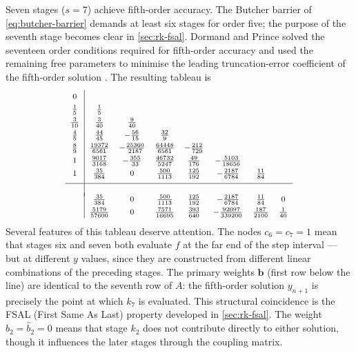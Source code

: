 Seven stages ($s = 7$) achieve fifth-order accuracy.  The Butcher barrier of \cref{eq:butcher-barrier}
demands at least six stages for order five; the purpose of the seventh
stage becomes clear in \cref{sec:rk-fsal}.  Dormand and Prince solved
the seventeen order conditions required for fifth-order accuracy and
used the remaining free parameters to minimise the leading
truncation-error coefficient of the fifth-order solution
\cite{DormandPrince1980}.  The resulting tableau is
%
\begin{equation}
  \renewcommand{\arraystretch}{1.4}
  \footnotesize
  \begin{array}{c|ccccccc}
    0      & & & & & & & \\
    \tfrac{1}{5}  & \tfrac{1}{5} & & & & & & \\
    \tfrac{3}{10} & \tfrac{3}{40} & \tfrac{9}{40} & & & & & \\
    \tfrac{4}{5}  & \tfrac{44}{45} & -\tfrac{56}{15} & \tfrac{32}{9} & & & & \\
    \tfrac{8}{9}  & \tfrac{19372}{6561} & -\tfrac{25360}{2187} & \tfrac{64448}{6561} & -\tfrac{212}{729} & & & \\
    1      & \tfrac{9017}{3168} & -\tfrac{355}{33} & \tfrac{46732}{5247} & \tfrac{49}{176} & -\tfrac{5103}{18656} & & \\
    1      & \tfrac{35}{384} & 0 & \tfrac{500}{1113} & \tfrac{125}{192} & -\tfrac{2187}{6784} & \tfrac{11}{84} & \\[4pt]
    \hline
    \\[-4pt]
           & \tfrac{35}{384} & 0 & \tfrac{500}{1113} & \tfrac{125}{192} & -\tfrac{2187}{6784} & \tfrac{11}{84} & 0 \\
           & \tfrac{5179}{57600} & 0 & \tfrac{7571}{16695} & \tfrac{393}{640} & -\tfrac{92097}{339200} & \tfrac{187}{2100} & \tfrac{1}{40}
  \end{array}
  \label{eq:dp-tableau}
\end{equation}
%
Several features of this tableau deserve attention.  The nodes
$c_6 = c_7 = 1$ mean that stages six and seven both evaluate $f$ at
the far end of the step interval --- but at different $y$ values,
since they are constructed from different linear combinations of the
preceding stages.  The primary weights $\mathbf{b}$ (first row below
the line) are identical to the seventh row of $A$: the fifth-order
solution $y_{n+1}$ is precisely the point at which $k_7$ is evaluated.
This structural coincidence is the FSAL (First Same As Last) property
developed in \cref{sec:rk-fsal}.  The weight $b_2 = \hat{b}_2 = 0$
means that stage $k_2$ does not contribute directly to either solution,
though it influences the later stages through the coupling matrix.


